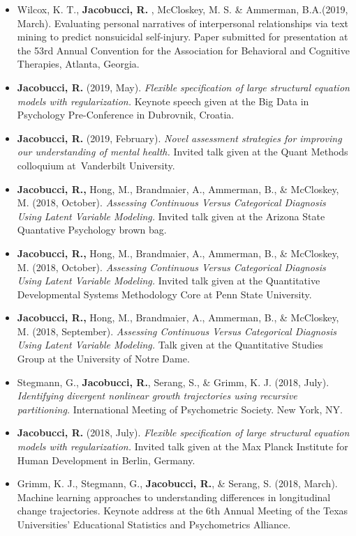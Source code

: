 \documentclass[letterpaper,10pt]{article}
\begin{document}
\begin{itemize}
\item[] Wilcox, K. T., \textbf{Jacobucci, R.} , McCloskey, M. S. \& Ammerman, B.A.(2019, March). Evaluating personal narratives of interpersonal relationships via text mining to predict nonsuicidal self-injury. Paper submitted for presentation at the 53rd Annual Convention for the Association for Behavioral and Cognitive Therapies, Atlanta, Georgia.
%
\item[]\textbf{Jacobucci, R.} (2019, May). \emph{Flexible specification of large structural equation models with regularization.} Keynote speech given at the Big Data in Psychology Pre-Conference in Dubrovnik, Croatia.
%
\item[]\textbf{Jacobucci, R.} (2019, February). \emph{Novel assessment strategies for improving our understanding of mental health.} Invited talk given at the Quant Methods colloquium at Vanderbilt University.
%
\item[]\textbf{Jacobucci, R.,} Hong, M., Brandmaier, A., Ammerman, B., \& McCloskey, M. (2018, October). \emph{Assessing Continuous Versus Categorical Diagnosis Using Latent Variable Modeling.} Invited talk given at the Arizona State Quantative Psychology brown bag.
%
\item[]\textbf{Jacobucci, R.,} Hong, M., Brandmaier, A., Ammerman, B., \& McCloskey, M. (2018, October). \emph{Assessing Continuous Versus Categorical Diagnosis Using Latent Variable Modeling.} Invited talk given at the Quantitative Developmental Systems Methodology Core at Penn State University.
%
\item[]\textbf{Jacobucci, R.,} Hong, M., Brandmaier, A., Ammerman, B., \& McCloskey, M. (2018, September). \emph{Assessing Continuous Versus Categorical Diagnosis Using Latent Variable Modeling.} Talk given at the Quantitative Studies Group at the University of Notre Dame.
%
\item[]Stegmann, G., \textbf{Jacobucci, R.}, Serang, S., \& Grimm, K. J. (2018, July). \emph{Identifying divergent nonlinear growth trajectories using recursive partitioning.} International Meeting of Psychometric Society. New York, NY.
%
\item[]\textbf{Jacobucci, R.} (2018, July). \emph{Flexible specification of large structural equation models with regularization.} Invited talk given at the Max Planck Institute for Human Development in Berlin, Germany.
%
\item[]Grimm, K. J., Stegmann, G., \textbf{Jacobucci, R.}, \& Serang, S. (2018, March). Machine learning approaches to understanding differences in longitudinal change trajectories. Keynote address at the 6th Annual Meeting of the Texas Universities' Educational Statistics and Psychometrics Alliance.

\end{itemize}
\end{document}

